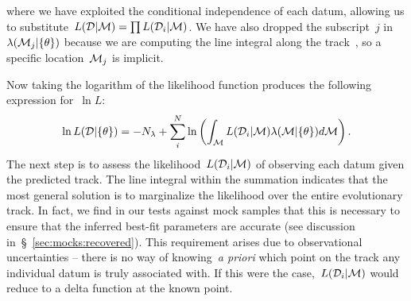 \documentclass[ms.tex]{subfiles}
\begin{document}
where we have exploited the conditional independence of each datum, allowing us
to substitute~$L(\mathcal{D} | \mathcal{M}) = \prod L(\mathcal{D}_i |
\mathcal{M})$.
We have also dropped the subscript~$j$ in~$\lambda(\mathcal{M}_j | \{\theta\})$
because we are computing the line integral along the track~, so a
specific location~$\mathcal{M}_j$ is implicit.
\par
Now taking the logarithm of the likelihood function produces the following
expression for~$\ln L$:
\begin{equation}
\ln L(\mathcal{D} | \{\theta\}) = -N_\lambda + \sum_i^N \ln \left(
\int_{\mathcal{M}} L(\mathcal{D}_i | \mathcal{M})\lambda(\mathcal{M} | \{\theta\})
d\mathcal{M}
\right).
\label{eq:lnL_with_integral}
\end{equation}
The next step is to assess the likelihood~$L(\mathcal{D}_i | \mathcal{M})$ of
observing each datum given the predicted track.
The line integral within the summation indicates that the most general solution
is to marginalize the likelihood over the entire evolutionary track.
In fact, we find in our tests against mock samples that this is necessary to
ensure that the inferred best-fit parameters are accurate (see discussion
in~\S~\ref{sec:mocks:recovered}).
This requirement arises due to observational uncertainties -- there is no way
of knowing~\textit{a priori} which point on the track any individual datum is
truly associated with.
If this were the case,~$L(\mathcal{D}_i | \mathcal{M})$ would reduce to a delta
function at the known point.
\end{document}
